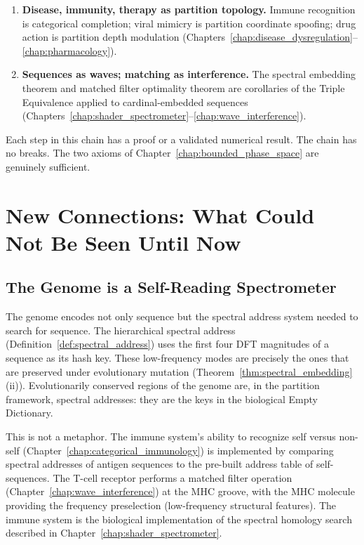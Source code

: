 \begin{enumerate}[label=\textbf{\arabic*.}]
        Chromatin remodeling, splicing, transcriptional bursting, and nuclear
        architecture are all oscillatory processes driven by partition boundary
        displacements (Chapters~\ref{chap:metabolic_clock}--\ref{chap:nuclear_architecture}).
  \item \textbf{Disease, immunity, therapy as partition topology.}
        Immune recognition is categorical completion; viral mimicry is
        partition coordinate spoofing; drug action is partition depth modulation
        (Chapters~\ref{chap:disease_dysregulation}--\ref{chap:pharmacology}).
  \item \textbf{Sequences as waves; matching as interference.}
        The spectral embedding theorem and matched filter optimality theorem
        are corollaries of the Triple Equivalence applied to cardinal-embedded
        sequences (Chapters~\ref{chap:shader_spectrometer}--\ref{chap:wave_interference}).
\end{enumerate}

Each step in this chain has a proof or a validated numerical result. The chain
has no breaks. The two axioms of Chapter~\ref{chap:bounded_phase_space} are
genuinely sufficient.

\section{New Connections: What Could Not Be Seen Until Now}
\label{sec:new_connections}

\subsection{The Genome is a Self-Reading Spectrometer}
\label{subsec:self_reading}

The genome encodes not only sequence but the spectral address system needed
to search for sequence. The hierarchical spectral address
(Definition~\ref{def:spectral_address}) uses the first four DFT magnitudes of
a sequence as its hash key. These low-frequency modes are precisely the ones
that are preserved under evolutionary mutation (Theorem~\ref{thm:spectral_embedding}(ii)).
Evolutionarily conserved regions of the genome are, in the partition framework,
spectral addresses: they are the keys in the biological Empty Dictionary.

This is not a metaphor. The immune system's ability to recognize self versus
non-self (Chapter~\ref{chap:categorical_immunology}) is implemented by
comparing spectral addresses of antigen sequences to the pre-built address
table of self-sequences. The T-cell receptor performs a matched filter operation
(Chapter~\ref{chap:wave_interference}) at the MHC groove, with the MHC molecule
providing the frequency preselection (low-frequency structural features).
The immune system is the biological implementation of the spectral homology
search described in Chapter~\ref{chap:shader_spectrometer}.

